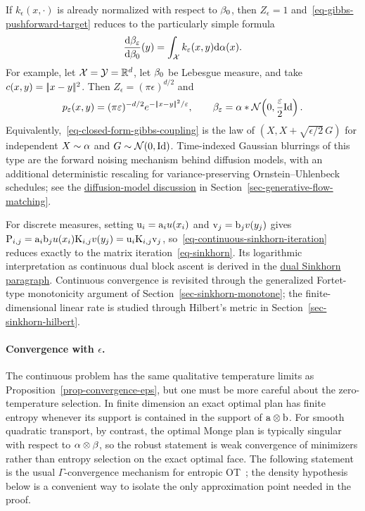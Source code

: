 If $k_\epsilon(x,\cdot)$ is already normalized with respect to $\beta_0$, then $Z_\epsilon=1$ and~\eqref{eq-gibbs-pushforward-target} reduces to the particularly simple formula
\[
	\frac{\mathrm{d}\beta_\varepsilon}{\mathrm{d}\beta_0}(y)
	=
	\int_{\mathcal{X}} k_\varepsilon(x,y)\mathrm{d}\alpha(x).
\]
For example, let $\mathcal{X}=\mathcal{Y}=\mathbb{R}^d$, let $\beta_0$ be Lebesgue measure, and take $c(x,y)=|\!| x-y |\!|^2$. Then $Z_\epsilon=(\pi\epsilon)^{d/2}$ and
\[
	p_\varepsilon(x,y)
	=
	(\pi\varepsilon)^{-d/2}e^{-|\!| x-y |\!|^2/\varepsilon},
	\qquad
	\beta_\varepsilon
	=
	\alpha*\mathcal{N}\!\left(0,\frac{\varepsilon}{2}\mathrm{Id}\right).
\]
Equivalently,~\eqref{eq-closed-form-gibbs-coupling} is the law of
\(
	(X,X+\sqrt{\epsilon/2}\,G)
\)
for independent $X\sim\alpha$ and $G\sim\mathcal{N}(0,\mathrm{Id})$. Time-indexed Gaussian blurrings of this type are the forward noising mechanism behind diffusion models, with an additional deterministic rescaling for variance-preserving Ornstein--Uhlenbeck schedules; see the \hyperref[par-diffusion-model-connection]{diffusion-model discussion} in Section~\ref{sec-generative-flow-matching}.

For discrete measures, setting $\mathrm{u}_i=\mathrm{a}_i u(x_i)$ and $\mathrm{v}_j=\mathrm{b}_j v(y_j)$ gives
\(
	\mathrm{P}_{i,j}=\mathrm{a}_i\mathrm{b}_j u(x_i)\mathrm{K}_{i,j}v(y_j)=\mathrm{u}_i\mathrm{K}_{i,j}\mathrm{v}_j
\),
so~\eqref{eq-continuous-sinkhorn-iteration} reduces exactly to the matrix iteration~\eqref{eq-sinkhorn}. Its logarithmic interpretation as continuous dual block ascent is derived in the \hyperref[par-continuous-dual-sinkhorn]{dual Sinkhorn paragraph}. Continuous convergence is revisited through the generalized Fortet-type monotonicity argument of Section~\ref{sec-sinkhorn-monotone}; the finite-dimensional linear rate is studied through Hilbert's metric in Section~\ref{sec-sinkhorn-hilbert}.

\paragraph{Convergence with \texorpdfstring{$\epsilon$}{epsilon}.}

The continuous problem has the same qualitative temperature limits as Proposition~\ref{prop-convergence-eps}, but one must be more careful about the zero-temperature selection. In finite dimension an exact optimal plan has finite entropy whenever its support is contained in the support of $\mathrm{a}\otimes\mathrm{b}$. For smooth quadratic transport, by contrast, the optimal Monge plan is typically singular with respect to $\alpha\otimes\beta$, so the robust statement is weak convergence of minimizers rather than entropy selection on the exact optimal face. The following statement is the usual $\Gamma$-convergence mechanism for entropic OT~\cite{leonard2012schrodinger,2017-carlier-SIMA}; the density hypothesis below is a convenient way to isolate the only approximation point needed in the proof.

